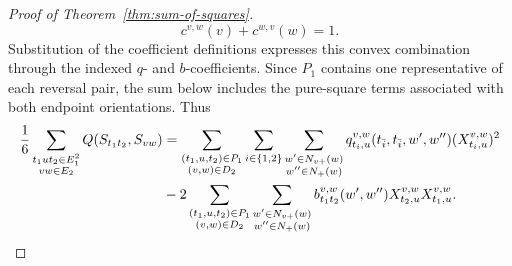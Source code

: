 \documentclass[pdflatex,sn-mathphys-num]{sn-jnl}
\theoremstyle{thmstyleone}
\begin{document}
\begin{proof}[Proof of Theorem~\ref{thm:sum-of-squares}]
\[
c^{v,w}(v)+c^{w,v}(w)=1.
\]
Substitution of the coefficient definitions expresses this convex combination
through the indexed $q$- and $b$-coefficients.
Since $P_1$ contains one representative of each
reversal pair, the sum below includes the pure-square terms associated with
both endpoint orientations.  Thus
\begin{align}
\frac16\sum_{\substack{t_1ut_2\in E_1^2\\vw\in E_2}}
Q(S_{t_1t_2},S_{vw})
&=\sum_{\substack{(t_1,u,t_2)\in P_1\\(v,w)\in D_2}}
\sum_{i\in\{1,2\}}
\sum_{\substack{w'\in N_{v+}(w)\\w''\in N_+(w)}}
q_{t_i,u}^{v,w}(t_{\bar i},t_{\bar i},w',w'')
(X_{t_i,u}^{v,w})^2                                        \notag\\
&-2\sum_{\substack{(t_1,u,t_2)\in P_1\\(v,w)\in D_2}}
\sum_{\substack{w'\in N_{v+}(w)\\w''\in N_+(w)}}
b_{t_1t_2}^{v,w}(w',w'')X_{t_2,u}^{v,w}X_{t_1,u}^{v,w}.
                                                               \label{eq:path-edge}
\end{align}


\end{proof}
\end{document}
